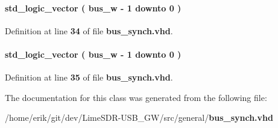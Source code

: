 \paragraph[{signal\+\_\+d1}]{ {\bfseries \textcolor{comment}{std\+\_\+logic\+\_\+vector}\textcolor{vhdlchar}{ }\textcolor{vhdlchar}{(}\textcolor{vhdlchar}{ }\textcolor{vhdlchar}{ }\textcolor{vhdlchar}{ }\textcolor{vhdlchar}{ }{\bfseries {\bf bus\+\_\+w}} \textcolor{vhdlchar}{-\/}\textcolor{vhdlchar}{ } \textcolor{vhdldigit}{1} \textcolor{vhdlchar}{ }\textcolor{keywordflow}{downto}\textcolor{vhdlchar}{ }\textcolor{vhdlchar}{ } \textcolor{vhdldigit}{0} \textcolor{vhdlchar}{ }\textcolor{vhdlchar}{)}\textcolor{vhdlchar}{ }} \hspace{0.3cm}{\ttfamily [Signal]}}\label{classbus__synch_1_1arch_a361717b5878695e57ac2b4c7274ee639}


Definition at line {\bf 34} of file {\bf bus\+\_\+synch.\+vhd}.

\paragraph[{signal\+\_\+d2}]{ {\bfseries \textcolor{comment}{std\+\_\+logic\+\_\+vector}\textcolor{vhdlchar}{ }\textcolor{vhdlchar}{(}\textcolor{vhdlchar}{ }\textcolor{vhdlchar}{ }\textcolor{vhdlchar}{ }\textcolor{vhdlchar}{ }{\bfseries {\bf bus\+\_\+w}} \textcolor{vhdlchar}{-\/}\textcolor{vhdlchar}{ } \textcolor{vhdldigit}{1} \textcolor{vhdlchar}{ }\textcolor{keywordflow}{downto}\textcolor{vhdlchar}{ }\textcolor{vhdlchar}{ } \textcolor{vhdldigit}{0} \textcolor{vhdlchar}{ }\textcolor{vhdlchar}{)}\textcolor{vhdlchar}{ }} \hspace{0.3cm}{\ttfamily [Signal]}}\label{classbus__synch_1_1arch_abe6f4bc66010547c1b2f259b388ab6f1}


Definition at line {\bf 35} of file {\bf bus\+\_\+synch.\+vhd}.



The documentation for this class was generated from the following file\+:\begin{DoxyCompactItemize}
\item 
/home/erik/git/dev/\+Lime\+S\+D\+R-\/\+U\+S\+B\+\_\+\+G\+W/src/general/{\bf bus\+\_\+synch.\+vhd}\end{DoxyCompactItemize}

